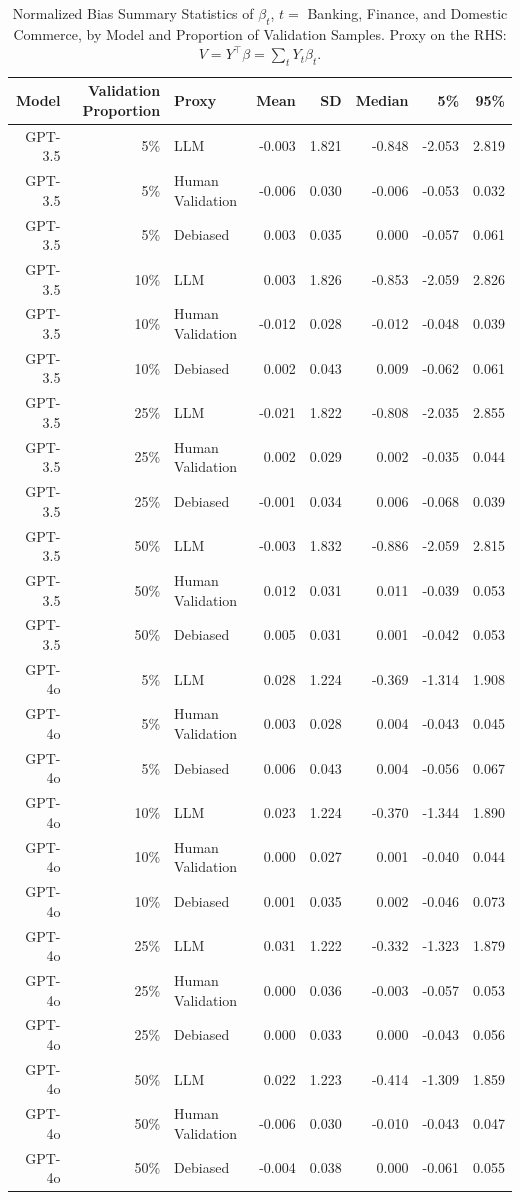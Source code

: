 \begin{table}

\caption{\label{tab:unnamed-chunk-1}Normalized Bias Summary Statistics of $\beta_{t}$, $t=$ Banking, Finance, and Domestic Commerce, by Model and Proportion of Validation Samples.
      Proxy on the RHS: $V = Y^\top \beta = \sum_{t} Y_t \beta_t$.}
\centering
\begin{tabular}[t]{rrlrrrrr}
\toprule
Model & Validation Proportion & Proxy & Mean & SD & Median & 5\% & 95\%\\
\midrule
GPT-3.5 & 5\% & LLM & -0.003 & 1.821 & -0.848 & -2.053 & 2.819\\
GPT-3.5 & 5\% & Human Validation & -0.006 & 0.030 & -0.006 & -0.053 & 0.032\\
GPT-3.5 & 5\% & Debiased & 0.003 & 0.035 & 0.000 & -0.057 & 0.061\\
GPT-3.5 & 10\% & LLM & 0.003 & 1.826 & -0.853 & -2.059 & 2.826\\
GPT-3.5 & 10\% & Human Validation & -0.012 & 0.028 & -0.012 & -0.048 & 0.039\\
GPT-3.5 & 10\% & Debiased & 0.002 & 0.043 & 0.009 & -0.062 & 0.061\\
GPT-3.5 & 25\% & LLM & -0.021 & 1.822 & -0.808 & -2.035 & 2.855\\
GPT-3.5 & 25\% & Human Validation & 0.002 & 0.029 & 0.002 & -0.035 & 0.044\\
GPT-3.5 & 25\% & Debiased & -0.001 & 0.034 & 0.006 & -0.068 & 0.039\\
GPT-3.5 & 50\% & LLM & -0.003 & 1.832 & -0.886 & -2.059 & 2.815\\
GPT-3.5 & 50\% & Human Validation & 0.012 & 0.031 & 0.011 & -0.039 & 0.053\\
GPT-3.5 & 50\% & Debiased & 0.005 & 0.031 & 0.001 & -0.042 & 0.053\\
GPT-4o & 5\% & LLM & 0.028 & 1.224 & -0.369 & -1.314 & 1.908\\
GPT-4o & 5\% & Human Validation & 0.003 & 0.028 & 0.004 & -0.043 & 0.045\\
GPT-4o & 5\% & Debiased & 0.006 & 0.043 & 0.004 & -0.056 & 0.067\\
GPT-4o & 10\% & LLM & 0.023 & 1.224 & -0.370 & -1.344 & 1.890\\
GPT-4o & 10\% & Human Validation & 0.000 & 0.027 & 0.001 & -0.040 & 0.044\\
GPT-4o & 10\% & Debiased & 0.001 & 0.035 & 0.002 & -0.046 & 0.073\\
GPT-4o & 25\% & LLM & 0.031 & 1.222 & -0.332 & -1.323 & 1.879\\
GPT-4o & 25\% & Human Validation & 0.000 & 0.036 & -0.003 & -0.057 & 0.053\\
GPT-4o & 25\% & Debiased & 0.000 & 0.033 & 0.000 & -0.043 & 0.056\\
GPT-4o & 50\% & LLM & 0.022 & 1.223 & -0.414 & -1.309 & 1.859\\
GPT-4o & 50\% & Human Validation & -0.006 & 0.030 & -0.010 & -0.043 & 0.047\\
GPT-4o & 50\% & Debiased & -0.004 & 0.038 & 0.000 & -0.061 & 0.055\\
\bottomrule
\end{tabular}
\end{table}
